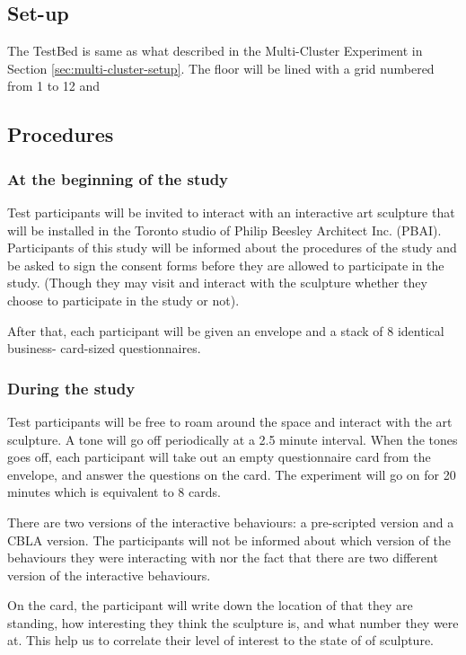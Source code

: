 \subsection{Set-up}

The TestBed is same as what described in the Multi-Cluster Experiment in Section \ref{sec:multi-cluster-setup}. The floor will be lined with a grid numbered from 1 to 12 and 

\subsection{Procedures}

\subsubsection{At the beginning of the study}

Test participants will be invited to interact with an interactive art sculpture that will be
installed in the Toronto studio of Philip Beesley Architect Inc. (PBAI). Participants of this study will be informed about the procedures of the study and be asked to sign the consent forms before they are allowed to participate in the study. (Though they may visit and interact with the sculpture whether they choose to participate in the study or not).

After that, each participant will be given an envelope and a stack of 8 identical business-
card-sized questionnaires. 


\subsubsection{During the study}

Test participants will be free to roam around the space and interact with the art sculpture. A tone will go off periodically at a 2.5 minute interval. When the tones goes off, each participant will take out an empty questionnaire card from the envelope, and answer the questions on the card. The experiment will go on for 20 minutes which is equivalent to 8 cards. 

There are two versions of the interactive behaviours: a pre-scripted version and a CBLA
version. The participants will not be informed about which version of the behaviours they
were interacting with nor the fact that there are two different version of the interactive
behaviours. 

On the card, the participant will write down the location of that they are standing, how interesting they think the sculpture is, and what number they were at. This help us to correlate their level of interest to the state of of sculpture.

